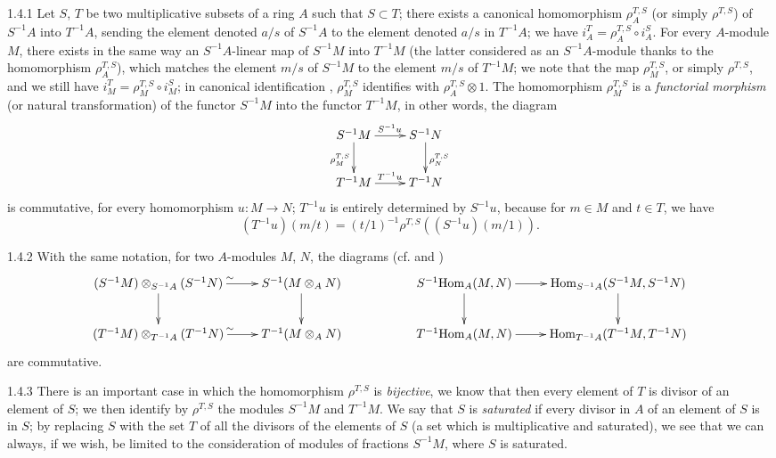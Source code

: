 \documentclass{book}
\begin{document}
\begin{env}{1.4.1}
\label{env-0.1.4.1}
Let $S$, $T$ be two multiplicative subsets of a ring $A$ such that $S\subset T$; there exists a canonical
homomorphism $\rho_A^{T,S}$ (or simply $\rho^{T,S}$) of $S^{-1}A$ into  $T^{-1}A$, sending the
element denoted $a/s$ of $S^{-1}A$ to the element denoted $a/s$ in $T^{-1}A$; we have
${i_A^T=\rho_A^{T,S}\circ i_A^S}$. For every $A$-module $M$, there exists in the same way an
$S^{-1}A$-linear map of $S^{-1}M$ into $T^{-1}M$ (the latter considered as an $S^{-1}A$-module thanks
to the homomorphism $\rho_A^{T,S}$), which matches the element $m/s$ of $S^{-1}M$ to the element $m/s$
of $T^{-1}M$; we note that the map $\rho_M^{T,S}$, or simply $\rho^{T,S}$, and we still have
$i_M^T=\rho_M^{T,S}\circ i_M^S$; in canonical identification , $\rho_M^{T,S}$ identifies with
$\rho_A^{T,S}\otimes 1$. The homomorphism $\rho_M^{T,S}$ is a \emph{functorial morphism} (or natural
transformation) of the functor $S^{-1}M$ into the functor $T^{-1}M$, in other words, the diagram
\[
  \xymatrix{
  S^{-1}M\ar[r]^{S^{-1}u}\ar[d]_{\rho_M^{T,S}} & S^{-1}N\ar[d]^{\rho_N^{T,S}}\\
  T^{-1}M\ar[r]^{T^{-1}u} & T^{-1}N
  }
\]
is commutative, for every homomorphism $u\colon M\to N$; $T^{-1}u$ is entirely determined by
$S^{-1}u$, because for $m\in M$ and $t\in T$, we have
\[
  (T^{-1}u)(m/t)=(t/1)^{-1}\rho^{T,S}((S^{-1}u)(m/1)).
\]
\end{env}

\begin{env}{1.4.2}
\label{env-0.1.4.2}
With the same notation, for two $A$-modules $M$, $N$, the diagrams (cf.  and )
\[
  \xymatrix{
    (S^{-1}M)\otimes_{S^{-1}A}(S^{-1}N)\ar[r]^\sim \ar[d] & S^{-1}(M\otimes_A N)\ar[d] & &
    S^{-1}\Hom_A(M,N)\ar[r]\ar[d] & \Hom_{S^{-1}A}(S^{-1}M,S^{-1}N)\ar[d]\\
    (T^{-1}M)\otimes_{T^{-1}A}(T^{-1}N)\ar[r]^\sim & T^{-1}(M\otimes_A N) & &
    T^{-1}\Hom_A(M,N)\ar[r] & \Hom_{T^{-1}A}(T^{-1}M,T^{-1}N)
  }
\]
are commutative.
\end{env}

\begin{env}{1.4.3}
\label{env-0.1.4.3}
There is an important case in which the homomorphism $\rho^{T,S}$ is \emph{bijective},
we know that then every element of $T$ is divisor of an element of $S$; we then identify by
$\rho^{T,S}$ the modules $S^{-1}M$ and $T^{-1}M$. We say that $S$ is \emph{saturated} if every divisor
in $A$ of an element of $S$ is in $S$; by replacing $S$ with  the set $T$ of all the divisors of the
elements of $S$ (a set which is multiplicative and saturated), we see that we can always, if we wish,
be limited to the consideration of modules of fractions $S^{-1}M$, where $S$ is saturated.
\end{env}
\end{document}
